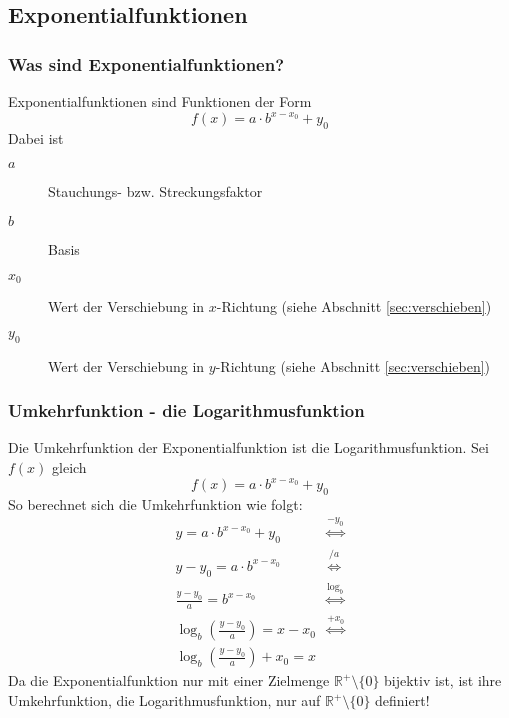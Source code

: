 \subsection{Exponentialfunktionen}
\subsubsection{Was sind Exponentialfunktionen?}
Exponentialfunktionen sind Funktionen der Form 
\begin{equation*}
f(x)=a \cdot b^{x-x_0}+y_0
\end{equation*}
Dabei ist
\begin{description}
\item[$a$] Stauchungs- bzw. Streckungsfaktor
\item[$b$] Basis
\item[$x_0$] Wert der Verschiebung in $x$-Richtung (siehe Abschnitt \ref{sec:verschieben})
\item[$y_0$] Wert der Verschiebung in $y$-Richtung (siehe Abschnitt \ref{sec:verschieben})
\end{description}

\subsubsection{Umkehrfunktion - die Logarithmusfunktion}
Die Umkehrfunktion der Exponentialfunktion ist die Logarithmusfunktion. Sei $f(x)$ gleich
\begin{equation*}
f(x) = a \cdot b^{x-x_0}+y_0
\end{equation*}
So berechnet sich die Umkehrfunktion wie folgt:
\begin{align*}
y = a \cdot b^{x-x_0}+y_0 & \stackrel{-y_0}{\iff}  \\
y - y_0 = a \cdot b^{x-x_0} &\stackrel{/ a}{\iff} \\
\frac{y - y_0}{a} =  b^{x-x_0} &\stackrel{\log_b}{\iff} \\
\log_b\left(\frac{y - y_0}{a}\right) = x - x_0 &\stackrel{+x_0}{\iff} \\
\log_b\left(\frac{y - y_0}{a}\right) + x_0 = x &
\end{align*}
Da die Exponentialfunktion nur mit einer Zielmenge $\mathbb{R}^{+} \setminus \{0\}$ bijektiv ist, ist ihre Umkehrfunktion, die Logarithmusfunktion, nur auf $\mathbb{R}^{+} \setminus \{0\}$ definiert!